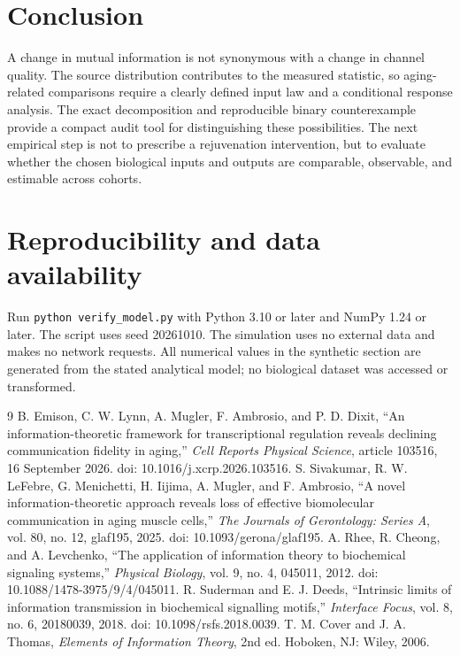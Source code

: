 \documentclass[11pt]{article}
\begin{document}
\section{Conclusion}
A change in mutual information is not synonymous with a change in channel quality. The source distribution contributes to the measured statistic, so aging-related comparisons require a clearly defined input law and a conditional response analysis. The exact decomposition and reproducible binary counterexample provide a compact audit tool for distinguishing these possibilities. The next empirical step is not to prescribe a rejuvenation intervention, but to evaluate whether the chosen biological inputs and outputs are comparable, observable, and estimable across cohorts.

\section*{Reproducibility and data availability}
Run \texttt{python verify\_model.py} with Python 3.10 or later and NumPy 1.24 or later. The script uses seed 20261010. The simulation uses no external data and makes no network requests. All numerical values in the synthetic section are generated from the stated analytical model; no biological dataset was accessed or transformed.

\clearpage
\begin{thebibliography}{9}
 B. Emison, C. W. Lynn, A. Mugler, F. Ambrosio, and P. D. Dixit, ``An information-theoretic framework for transcriptional regulation reveals declining communication fidelity in aging,'' \emph{Cell Reports Physical Science}, article 103516, 16 September 2026. doi: 10.1016/j.xcrp.2026.103516.
 S. Sivakumar, R. W. LeFebre, G. Menichetti, H. Iijima, A. Mugler, and F. Ambrosio, ``A novel information-theoretic approach reveals loss of effective biomolecular communication in aging muscle cells,'' \emph{The Journals of Gerontology: Series A}, vol. 80, no. 12, glaf195, 2025. doi: 10.1093/gerona/glaf195.
 A. Rhee, R. Cheong, and A. Levchenko, ``The application of information theory to biochemical signaling systems,'' \emph{Physical Biology}, vol. 9, no. 4, 045011, 2012. doi: 10.1088/1478-3975/9/4/045011.
 R. Suderman and E. J. Deeds, ``Intrinsic limits of information transmission in biochemical signalling motifs,'' \emph{Interface Focus}, vol. 8, no. 6, 20180039, 2018. doi: 10.1098/rsfs.2018.0039.
 T. M. Cover and J. A. Thomas, \emph{Elements of Information Theory}, 2nd ed. Hoboken, NJ: Wiley, 2006.
\end{thebibliography}
\end{document}

